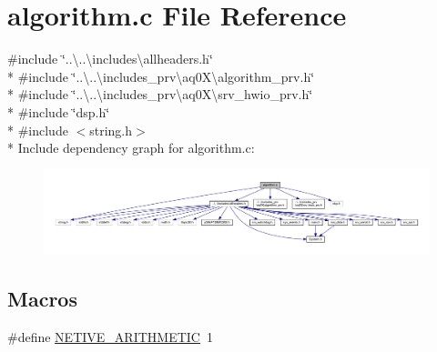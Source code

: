 \hypertarget{a00038}{\section{algorithm.\+c File Reference}
\label{a00038}
}
{\ttfamily \#include \char`\"{}..\textbackslash{}..\textbackslash{}includes\textbackslash{}allheaders.\+h\char`\"{}}\\*
{\ttfamily \#include \char`\"{}..\textbackslash{}..\textbackslash{}includes\+\_\+prv\textbackslash{}aq0\+X\textbackslash{}algorithm\+\_\+prv.\+h\char`\"{}}\\*
{\ttfamily \#include \char`\"{}..\textbackslash{}..\textbackslash{}includes\+\_\+prv\textbackslash{}aq0\+X\textbackslash{}srv\+\_\+hwio\+\_\+prv.\+h\char`\"{}}\\*
{\ttfamily \#include \char`\"{}dsp.\+h\char`\"{}}\\*
{\ttfamily \#include $<$string.\+h$>$}\\*
Include dependency graph for algorithm.\+c\+:\nopagebreak
\begin{figure}[H]
\begin{center}
\leavevmode
\includegraphics[width=350pt]{d2/dac/a00876}
\end{center}
\end{figure}
\subsection*{Macros}
\begin{DoxyCompactItemize}
\item 
\#define \hyperlink{a00038_ac8ba8f308052e254ac745ae76f44d766}{N\+E\+T\+I\+V\+E\+\_\+\+A\+R\+I\+T\+H\+M\+E\+T\+I\+C}~1
\end{DoxyCompactItemize}
